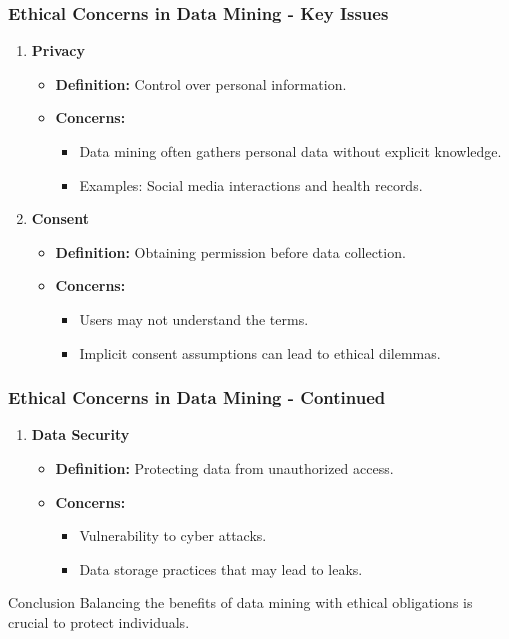 \documentclass{beamer}
\begin{document}
\begin{frame}[fragile]
    \frametitle{Ethical Concerns in Data Mining - Key Issues}
    \begin{enumerate}
        \item \textbf{Privacy}
        \begin{itemize}
            \item \textbf{Definition:} Control over personal information.
            \item \textbf{Concerns:}
            \begin{itemize}
                \item Data mining often gathers personal data without explicit knowledge.
                \item Examples: Social media interactions and health records.
            \end{itemize}
        \end{itemize}
        
        \item \textbf{Consent}
        \begin{itemize}
            \item \textbf{Definition:} Obtaining permission before data collection.
            \item \textbf{Concerns:}
            \begin{itemize}
                \item Users may not understand the terms.
                \item Implicit consent assumptions can lead to ethical dilemmas.
            \end{itemize}
        \end{itemize}
    \end{enumerate}
\end{frame}

\begin{frame}[fragile]
    \frametitle{Ethical Concerns in Data Mining - Continued}
    \begin{enumerate}[resume]
        \item \textbf{Data Security}
        \begin{itemize}
            \item \textbf{Definition:} Protecting data from unauthorized access.
            \item \textbf{Concerns:}
            \begin{itemize}
                \item Vulnerability to cyber attacks.
                \item Data storage practices that may lead to leaks.
            \end{itemize}
        \end{itemize}
    \end{enumerate}
    
    \begin{block}{Conclusion}
        Balancing the benefits of data mining with ethical obligations is crucial to protect individuals.
    \end{block}
\end{frame}
\end{document}

